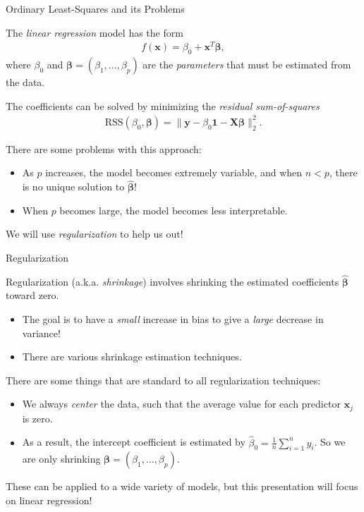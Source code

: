 \documentclass[8pt]{beamer}
\newcommand{\mydef}[1]{\textcolor{SteelBlue3}{\textit{#1}}} %
\begin{document}
\begin{frame}{Ordinary Least-Squares and its Problems}

The \mydef{linear regression} model has the form 
\begin{align*}
    f(\bm{x}) = \beta_0 + \bm{x}^T \bm{\beta},
\end{align*}
where $\beta_0$ and $\bm{\beta} = (\beta_1,\ldots,\beta_p)$ are the \mydef{parameters} that must be estimated from the data. %

The coefficients can be solved by minimizing the \mydef{residual sum-of-squares}
\begin{align*}
    \mathrm{RSS}(\beta_0, \bm{\beta}) = \| \mathbf{y} - \beta_0 \mathbf{1} - \mathbf{X} \bm{\beta} \|_2^2.
\end{align*}

There are some problems with this approach: %
\begin{itemize}
    \item As $p$ increases, the model becomes extremely variable, and when $n < p$, there is no unique solution to $\hat{\bm{\beta}}$! %
    \item When $p$ becomes large, the model becomes less interpretable. %
\end{itemize}

We will use \mydef{regularization} to help us out!

    
\end{frame}

\begin{frame}{Regularization}

Regularization (a.k.a. \mydef{shrinkage}) involves shrinking the estimated coefficients $\hat{\bm{\beta}}$ toward zero. %
\begin{itemize}
    \item The goal is to have a \textit{small} increase in bias to give a \textit{large} decrease in variance! %
    \item There are various shrinkage estimation techniques. %
\end{itemize}

There are some things that are standard to all regularization techniques: %
\begin{itemize}
    \item We always \mydef{center} the data, such that the average value for each predictor $\mathbf{x}_j$ is zero. %
    \item As a result, the intercept coefficient is estimated by $\displaystyle \hat{\beta}_0 = \frac{1}{n} \sum_{i=1}^n y_i$. So we are only shrinking $\bm{\beta} = (\beta_1,\ldots,\beta_p)$. %
\end{itemize}

These can be applied to a wide variety of models, but this presentation will focus on linear regression!
    
\end{frame}
\end{document}
